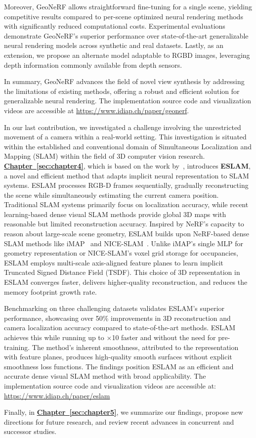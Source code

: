 Moreover, GeoNeRF allows straightforward fine-tuning for a single scene, yielding competitive results compared to per-scene optimized neural rendering methods with significantly reduced computational costs. Experimental evaluations demonstrate GeoNeRF's superior performance over state-of-the-art generalizable neural rendering models across synthetic and real datasets. Lastly, as an extension, we propose an alternate model adaptable to RGBD images, leveraging depth information commonly available from depth sensors.

In summary, GeoNeRF advances the field of novel view synthesis by addressing the limitations of existing methods, offering a robust and efficient solution for generalizable neural rendering. The implementation source code and visualization videos are accessible at \href{https://www.idiap.ch/paper/geonerf}{https://www.idiap.ch/paper/geonerf}.

In our last contribution, we investigated a challenge involving the unrestricted movement of a camera within a real-world setting. This investigation is situated within the established and conventional domain of Simultaneous Localization and Mapping (SLAM) within the field of 3D computer vision research. \textbf{\hyperref[sec:chapter4]{Chapter~\ref{sec:chapter4}}}, which is based on the work by~\cite{johari2023eslam}, introduces \textbf{ESLAM}, a novel and efficient method that adapts implicit neural representation to SLAM systems. ESLAM processes RGB-D frames sequentially, gradually reconstructing the scene while simultaneously estimating the current camera position. Traditional SLAM systems primarily focus on localization accuracy, while recent learning-based dense visual SLAM methods provide global 3D maps with reasonable but limited reconstruction accuracy. Inspired by NeRF's capacity to reason about large-scale scene geometry, ESLAM builds upon NeRF-based dense SLAM methods like iMAP~\citep{sucar2021imap} and NICE-SLAM~\citep{zhu2022nice}. Unlike iMAP's single MLP for geometry representation or NICE-SLAM's voxel grid storage for occupancies, ESLAM employs multi-scale axis-aligned feature planes to learn implicit Truncated Signed Distance Field (TSDF). This choice of 3D representation in ESLAM converges faster, delivers higher-quality reconstruction, and reduces the memory footprint growth rate.

Benchmarking on three challenging datasets validates ESLAM's superior performance, showcasing over 50\% improvements in 3D reconstruction and camera localization accuracy compared to state-of-the-art methods. ESLAM achieves this while running up to $\times$10 faster and without the need for pre-training. The method's inherent smoothness, attributed to the representation with feature planes, produces high-quality smooth surfaces without explicit smoothness loss functions. The findings position ESLAM as an efficient and accurate dense visual SLAM method with broad applicability. The implementation source code and visualization videos are accessible at: \href{https://www.idiap.ch/paper/eslam}{https://www.idiap.ch/paper/eslam}

Finally, in \textbf{\hyperref[sec:chapter5]{Chapter~\ref{sec:chapter5}}}, we summarize our findings, propose new directions for future research, and review recent advances in concurrent and successor studies.